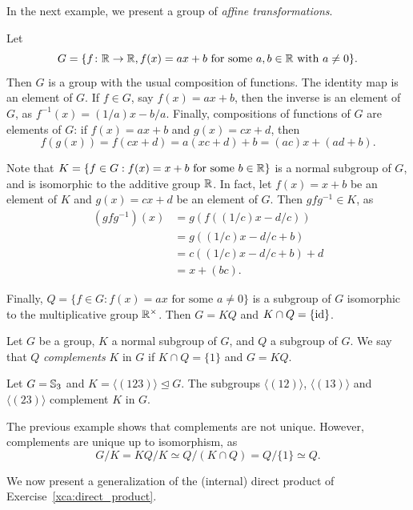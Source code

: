 In the next example, we present a group of \emph{affine transformations}. 

\begin{example}
\label{exa:affine}
    Let 
    \[ 
    G=\{f\colon\mathbb{R}\to\mathbb{R}, f(x)=ax+b\text{ for some $a,b\in\mathbb{R}$ with $a\ne 0$}\}.
    \]
    Then $G$ is a group with the usual composition of functions. The identity map is an element of $G$. 
    If $f\in G$, say $f(x)=ax+b$, then the inverse is an element of $G$, as 
    $f^{-1}(x)=(1/a)x-b/a$. Finally, compositions of functions of $G$ are elements of $G$: 
    if $f(x)=ax+b$ and $g(x)=cx+d$, then 
    \[
    f(g(x))=f(cx+d)=a(xc+d)+b=(ac)x+(ad+b).
    \]
    
    Note that $K=\{f\in G:f(x)=x+b\text{ for some $b\in\mathbb{R}$}\}$ is a normal subgroup 
    of $G$, and is isomorphic to the additive group $\mathbb{R}$. In fact, let $f(x)=x+b$ be an element of $K$ 
    and $g(x)=cx+d$ be an element of $G$. Then $gfg^{-1}\in K$, as 
    \begin{align*}
    (gfg^{-1})(x)&=g(f((1/c)x-d/c))\\
    &=g((1/c)x-d/c+b)\\
    &=c( (1/c)x-d/c+b)+d\\
    &=x+(bc).
    \end{align*}
    
    Finally, 
    $Q=\{f\in G:f(x)=ax\text{ for some $a\ne0$}\}$ is a subgroup of $G$ isomorphic to the multiplicative group $\mathbb{R}^{\times}$. 
    Then $G=KQ$ and $K\cap Q=\{\operatorname{id}\}$.
\end{example}

\begin{definition}
Let $G$ be a group, $K$ a normal subgroup of $G$, and $Q$ a subgroup of $G$. We say
that $Q$ \emph{complements} $K$ in $G$ if $K\cap Q=\{1\}$ and $G=KQ$.
\end{definition}

\begin{example}
Let $G=\mathbb{S}_3$ and $K=\langle (123)\rangle\unlhd G$. The subgroups
$\langle (12)\rangle$, $\langle
(13)\rangle$ and $\langle (23)\rangle$ complement $K$ in $G$.
\end{example}

The previous example shows that complements are not unique. However, 
complements are unique up to isomorphism, as 
\[
G/K= KQ/K\simeq Q/(K\cap Q)=Q/\{1\}\simeq Q.
\]

We now present a generalization of the (internal) direct product of
Exercise~\ref{xca:direct_product}. 

